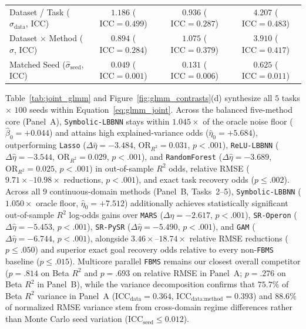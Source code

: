 \documentclass[11pt,a4paper]{article}
\begin{document}
\begin{table}[t!]
{\begin{tabular}{lcccccc}
Dataset / Task ($\hat{\sigma}_{\text{data}}$, $\mathrm{ICC}$) & \multicolumn{2}{c}{$1.186$ ($\mathrm{ICC} = 0.499$)} & \multicolumn{2}{c}{$0.936$ ($\mathrm{ICC} = 0.287$)} & \multicolumn{2}{c}{$4.207$ ($\mathrm{ICC} = 0.483$)} \\
Dataset $\times$ Method ($\hat{\sigma}$, $\mathrm{ICC}$) & \multicolumn{2}{c}{$0.894$ ($\mathrm{ICC} = 0.284$)} & \multicolumn{2}{c}{$1.075$ ($\mathrm{ICC} = 0.379$)} & \multicolumn{2}{c}{$3.910$ ($\mathrm{ICC} = 0.417$)} \\
Matched Seed ($\hat{\sigma}_{\text{seed}}$, $\mathrm{ICC}$) & \multicolumn{2}{c}{$0.049$ ($\mathrm{ICC} = 0.001$)} & \multicolumn{2}{c}{$0.131$ ($\mathrm{ICC} = 0.006$)} & \multicolumn{2}{c}{$0.625$ ($\mathrm{ICC} = 0.011$)} \\
\bottomrule
\end{tabular}%
}
\end{table}

Table~\ref{tab:joint_glmm} and Figure~\ref{fig:glmm_contrasts}(d) synthesize all $5$ tasks $\times$ $100$ seeds within Equation~\eqref{eq:glmm_joint}. Across the balanced five-method core (Panel~A), \texttt{Symbolic-LBBNN} stays within $1.045\times$ of the oracle noise floor ($\hat{\beta}_0 = +0.044$) and attains high explained-variance odds ($\hat{\eta}_0 = +5.684$), outperforming \texttt{Lasso} ($\Delta\hat{\eta} = -3.484$, $\mathrm{OR}_{R^2} = 0.031$, $p < .001$), \texttt{ReLU-LBBNN} ($\Delta\hat{\eta} = -3.544$, $\mathrm{OR}_{R^2} = 0.029$, $p < .001$), and \texttt{RandomForest} ($\Delta\hat{\eta} = -3.689$, $\mathrm{OR}_{R^2} = 0.025$, $p < .001$) in out-of-sample $R^2$ odds, relative RMSE ($9.71\times\text{--}10.98\times$ reductions, $p < .001$), and exact task recovery odds ($p \le .002$). Across all $9$ continuous-domain methods (Panel~B, Tasks~2--5), \texttt{Symbolic-LBBNN} ($1.050\times$ oracle floor, $\hat{\eta}_0 = +7.512$) additionally achieves statistically significant out-of-sample $R^2$ log-odds gains over \texttt{MARS} ($\Delta\hat{\eta} = -2.617$, $p < .001$), \texttt{SR-Operon} ($\Delta\hat{\eta} = -5.453$, $p < .001$), \texttt{SR-PySR} ($\Delta\hat{\eta} = -5.490$, $p < .001$), and \texttt{GAM} ($\Delta\hat{\eta} = -6.744$, $p < .001$), alongside $3.46\times\text{--}18.74\times$ relative RMSE reductions ($p \le .050$) and superior exact goal recovery odds relative to every non-\texttt{FBMS} baseline ($p \le .015$). Multicore parallel \texttt{FBMS} remains our closest overall competitor ($p = .814$ on Beta $R^2$ and $p = .693$ on relative RMSE in Panel~A; $p = .276$ on Beta $R^2$ in Panel~B), while the variance decomposition confirms that $75.7\%$ of Beta $R^2$ variance in Panel~A ($\mathrm{ICC}_{\text{data}} = 0.364$, $\mathrm{ICC}_{\text{data:method}} = 0.393$) and $88.6\%$ of normalized RMSE variance stem from cross-domain regime differences rather than Monte Carlo seed variation ($\mathrm{ICC}_{\text{seed}} \le 0.012$).
\end{document}
